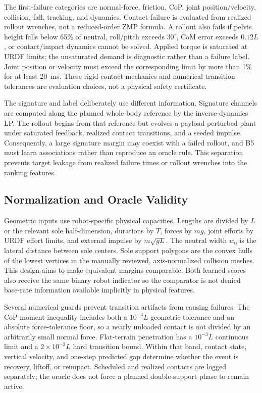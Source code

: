 \documentclass[letterpaper,10pt,conference]{IEEEtran}
\begin{document}
The first-failure categories are normal-force, friction, CoP, joint
position/velocity, collision, fall, tracking, and dynamics.
Contact failure is evaluated from realized rollout wrenches, not a reduced-order
ZMP formula. A rollout also fails if pelvis height falls below 65\% of neutral,
roll/pitch exceeds $30^\circ$, CoM error exceeds $0.12L$, or contact/impact
dynamics cannot be solved. Applied torque is saturated at URDF limits; the
unsaturated demand is diagnostic rather than a failure label. Joint position or
velocity must exceed the corresponding limit by more than 1\% for at least
20~ms. These rigid-contact mechanics and numerical transition tolerances are
evaluation choices, not a physical safety certificate.

The signature and label deliberately use different information. Signature
channels are computed along the planned whole-body reference by the
inverse-dynamics LP. The rollout begins from that reference but evolves a
payload-perturbed plant under saturated feedback, realized contact transitions,
and a seeded impulse. Consequently, a large signature margin may coexist with
a failed rollout, and B5 must learn associations rather than reproduce an
oracle rule. This separation prevents target leakage from realized failure
times or rollout wrenches into the ranking features.

\subsection{Normalization and Oracle Validity}
Geometric inputs use robot-specific physical capacities. Lengths are divided by
$L$ or the relevant sole half-dimension,
durations by $T$, forces by $mg$, joint efforts by URDF effort limits, and
external impulse by $m\sqrt{gL}$. The neutral width $w_0$ is the lateral
distance between sole centers. Sole support polygons are the convex hulls of
the lowest vertices in the manually reviewed, axis-normalized collision meshes.
This design aims to make equivalent margins comparable. Both learned scores
also receive the same binary robot indicator so the comparator is not denied
base-rate information available implicitly in physical features.

Several numerical guards prevent transition artifacts from causing failures.
The CoP moment inequality includes both a $10^{-4}L$ geometric tolerance and an
absolute force-tolerance floor, so a nearly unloaded contact is not divided by
an arbitrarily small normal force. Flat-terrain penetration has a
$10^{-3}L$ continuous limit and a $2\times10^{-3}L$ hard transition bound.
Within that band, contact state, vertical velocity, and one-step predicted gap
determine whether the event is recovery, liftoff, or reimpact. Scheduled and
realized contacts are logged separately; the oracle does not force a planned
double-support phase to remain active.
\end{document}
